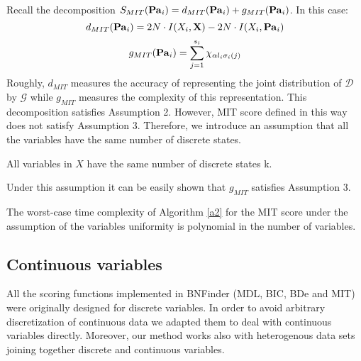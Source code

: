 Recall the decomposition $ S_{MIT}(\mathbf{Pa}_i) = d_{MIT}(\mathbf{Pa}_i) + g_{MIT}(\mathbf{Pa}_i) $. 
In this case:  
$$ d_{MIT}(\mathbf{Pa}_i) = 2N\cdot I(X_i, \mathbf{X}) - 2N \cdot I(X_i, \mathbf{Pa}_i) $$
$$ g_{MIT}(\mathbf{Pa}_i) = \sum_{j=1}^{s_i} \chi_{\alpha l_i \sigma_i(j)} $$ 
Roughly, $d_{MIT}$ measures the accuracy of representing the joint distribution of 
$\mathcal{D}$ by $\mathcal{G}$ while $g_{MIT}$ measures the complexity of this representation. This decomposition
satisfies Assumption 2.
However, MIT score defined in this way does not satisfy Assumption 3.
Therefore, we introduce an assumption that all the variables have the same number of discrete states.

\begin{ass}[uniformity]\label{as4}
 All variables in $X$ have the same number of discrete states k.
\end{ass}

Under this assumption it can be easily shown that $g_{MIT}$ satisfies Assumption 3.
 \begin{theorem} \cite{globMITManual}
 The worst-case time complexity of Algorithm \ref{a2} for the MIT score under the assumption of the variables uniformity is polynomial in the number of variables. 
 \end{theorem}


\subsection{Continuous variables}

All the scoring functions implemented in BNFinder (MDL, BIC, BDe and MIT) 
were originally designed for discrete variables.
In order to avoid arbitrary discretization of continuous data 
we adapted them to deal with continuous variables directly. 
Moreover, our method works also with heterogenous data sets 
joining together discrete and continuous variables.


